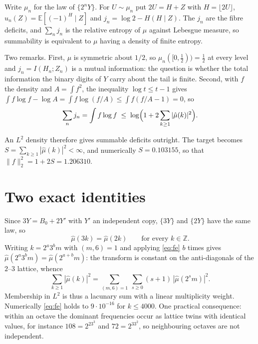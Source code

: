 \documentclass[11pt]{article}
\theoremstyle{remark}
\begin{document}
Write $\mu_n$ for the law of $\{2^nY\}$. For $U\sim\mu_n$ put $2U=H+Z$ with $H=\lfloor 2U\rfloor$,
$u_n(Z)=\mathbb E[(-1)^H\mid Z]$ and $j_n=\log2-H(H\mid Z)$. The $j_n$ are the fibre deficits, and
$\sum_n j_n$ is the relative entropy of $\mu$ against Lebesgue measure, so summability is equivalent to
$\mu$ having a density of finite entropy.

Two remarks. First, $\mu$ is symmetric about $1/2$, so $\mu_n([0,\tfrac12))=\tfrac12$ at every level and
$j_n=I(H_n;Z_n)$ is a mutual information: the question is whether the total information the binary digits
of $Y$ carry about the tail is finite. Second, with $f$ the density and $A=\int f^2$, the inequality
$\log t\le t-1$ gives $\int f\log f-\log A=\int f\log(f/A)\le\int f(f/A-1)=0$, so
\begin{equation}\label{eq:red}
  \sum_n j_n=\int f\log f\;\le\;\log\Bigl(1+2\sum_{k\ge1}|\hat\mu(k)|^2\Bigr).
\end{equation}
\begin{sloppypar}
An $L^2$ density therefore gives summable deficits outright. The target becomes
$S=\sum_{k\ge1}|\hat\mu(k)|^2<\infty$, and numerically $S=0.103155$, so that
$\|f\|_2^2=1+2S=1.206310$.
\end{sloppypar}

\section{Two exact identities}

Since $3Y=B_0+2Y'$ with $Y'$ an independent copy, $\{3Y\}$ and $\{2Y\}$ have the same law, so
\begin{equation}\label{eq:fe}
  \hat\mu(3k)=\hat\mu(2k)\qquad\text{for every }k\in\mathbb Z .
\end{equation}
Writing $k=2^a3^bm$ with $(m,6)=1$ and applying \eqref{eq:fe} $b$ times gives
$\hat\mu(2^a3^bm)=\hat\mu(2^{a+b}m)$: the transform is constant on the anti-diagonals of the $2$--$3$
lattice, whence
\begin{equation}\label{eq:rearr}
  \sum_{k\ge1}|\hat\mu(k)|^2=\sum_{(m,6)=1}\ \sum_{s\ge0}(s+1)\,|\hat\mu(2^sm)|^2 .
\end{equation}
Membership in $L^2$ is thus a lacunary sum with a linear multiplicity weight. Numerically \eqref{eq:fe}
holds to $9\cdot10^{-16}$ for $k\le4000$. One practical consequence: within an octave the dominant
frequencies occur as lattice twins with identical values, for instance $108=2^23^3$ and $72=2^33^2$, so
neighbouring octaves are not independent.
\end{document}
